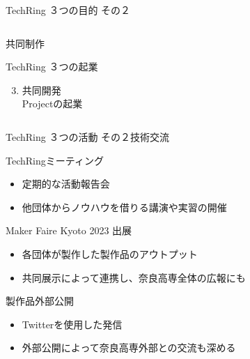 \documentclass[dvipdfmx]{beamer}
\begin{document}
\begin{frame}{TechRing ３つの目的 その２}
\begin{columns}
    \begin{column}{0.30\textwidth}
      \begin{block}{共同制作}
        \begin{footnotesize}
          TechRing ３つの起業 \par
          \begin{enumerate}
            \setcounter{enumi}{2}
            \item 共同開発\\Projectの起業
          \end{enumerate}
        \end{footnotesize}
      \end{block}
    \end{column}
  \end{columns}
\end{frame}

\begin{frame}{TechRing ３つの活動 その２}{技術交流}
  \begin{alertblock}{TechRingミーティング}
    \begin{itemize}
      \item 定期的な活動報告会
      \item 他団体からノウハウを借りる講演や実習の開催
    \end{itemize}
  \end{alertblock}

  \begin{alertblock}{Maker Faire Kyoto 2023 出展}
    \begin{itemize}
      \item 各団体が製作した製作品のアウトプット
      \item 共同展示によって連携し、奈良高専全体の広報にも
    \end{itemize}
  \end{alertblock}

  \begin{block}{製作品外部公開}
    \begin{itemize}
      \item Twitterを使用した発信
      \item 外部公開によって奈良高専外部との交流も深める
    \end{itemize}
  \end{block}
\end{frame}
\end{document}
